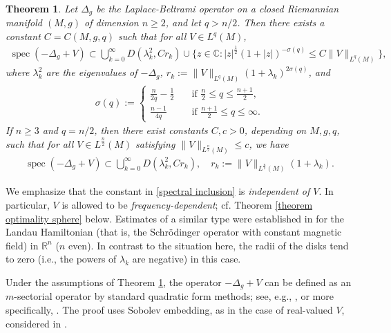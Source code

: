 \documentclass[12pt]{amsart}
\newcommand{\R}{{\mathbb R}}
\newcommand{\C}{{\mathbb C}}
\DeclareMathOperator{\spec}{spec}
\newtheorem{theorem}{Theorem}[section]
\begin{document}
  \begin{theorem}\label{theorem main}
Let $\Delta_g$ be the Laplace-Beltrami operator on a closed Riemannian manifold $(M,g)$ of dimension $n\geq 2$, and let $q> n/2$. Then there exists a constant $C=C(M,g,q)$ such that for all $V\in L^q(M)$,
\begin{align}\label{spectral inclusion}
    \spec(-\Delta_{g}+V)\subset \bigcup_{k=0}^{\infty}D(\lambda_k^2,Cr_k)\cup \{z\in\C: |z|^{\frac{1}{2}}(1+|z|)^{-\sigma(q)}\leq C \|V\|_{L^q(M)}\},
\end{align}
where $\lambda_k^2$ are the eigenvalues of $-\Delta_g$, 
$r_k:=\|V\|_{L^q(M)}(1+\lambda_k)^{2\sigma(q)}$,
and
\begin{align}\label{sigma(q)}
    \sigma(q):=\begin{cases}
        \frac{n}{2q}-\frac{1}{2}\quad &\mbox{if } \frac{n}{2}\leq  q\leq \frac{n+1}{2},\\
        \frac{n-1}{4q}\quad &\mbox{if } \frac{n+1}{2}\leq q\leq \infty. 
    \end{cases}   
\end{align}
If $n\geq 3$ and $q=n/2$, then there exist constants $C,c>0$, depending on $M,g,q$, such that for all $V\in L^{\frac{n}{2}}(M)$ satisfying $\|V\|_{L^{\frac{n}{2}}(M)}\leq c$, we have
\begin{align}\label{q=n/2 spectral inclusion}
    \spec(-\Delta_{g}+V)\subset \bigcup_{k=0}^{\infty}D(\lambda_k^2,Cr_k),\quad r_k:=\|V\|_{L^{\frac{n}{2}}(M)}(1+\lambda_k).
\end{align}
\end{theorem}

We emphasize that the constant in \eqref{spectral inclusion} is \textit{independent of $V$}. In particular, $V$ is allowed to be \emph{frequency-dependent}; cf. Theorem \ref{theorem optimality sphere} below. Estimates of a similar type were established in \cite{MR3655948} for the Landau Hamiltonian (that is, the Schr\"odinger operator with constant magnetic field) in $\R^n$ ($n$ even). In contrast to the situation here, the radii of the disks tend to zero (i.e., the powers of $\lambda_k$ are negative) in this case.


Under the assumptions of Theorem \ref{theorem main}, the operator $-\Delta_g+V$ can be defined as an $m$-sectorial operator by standard quadratic form methods; see, e.g., \cite{MR1335452}, or more specifically, \cite[Appendix B]{MR3717979}. The proof uses Sobolev embedding, as in the case of real-valued $V$, considered in \cite[Section 6]{MR4445914}.
\end{document}

